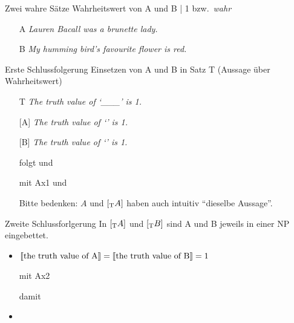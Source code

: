 \begin{frame}
  {Zwei wahre Sätze}
  \onslide<+->
  \onslide<+->
  Wahrheitswert von A und B | 1 bzw.\ \textit{wahr}\\
  \onslide<+->
  \Zeile
  \begin{itemize}[<+->]
    \item[A] \textit{Lauren Bacall was a brunette lady.}
    \item[B] \textit{My humming bird's favourite flower is red.} 
  \end{itemize}
\end{frame}

\begin{frame}
  {Erste Schlussfolgerung}
  \onslide<+->
  \onslide<+->
  Einsetzen von A und B in Satz T (Aussage über Wahrheitswert)\\
  \Halbzeile
  \begin{itemize}[<+->]
    \item[T] \alert{\textit{The truth value of `\_\_\_' is 1.}}
      \Halbzeile
    \item[{[\Sub{T}A]}] \alert{\textit{The truth value of `' is 1.}}
    \item[{[\Sub{T}B]}] \alert{\textit{The truth value of `' is 1.}}
      \Halbzeile
    \item[ ] folgt  und 
    \item[ ] mit Ax1  und 
      \Halbzeile
    \item[ ] Bitte bedenken: $A$ und $[_{\text{T}}A]$ haben auch intuitiv "`dieselbe Aussage"'.
  \end{itemize}
\end{frame}

\begin{frame}
  {Zweite Schlussforlgerung}
  \onslide<+->
  \onslide<+->
  In $[_{\text{T}}A]$ und $[_{\text{T}}B]$ sind A und B jeweils in einer NP eingebettet.\\
  \Halbzeile
  \begin{itemize}[<+->]
    \item $\llbracket\text{the truth value of A}\rrbracket=\llbracket\text{the truth value of B}\rrbracket=1$
    \item[ ] mit Ax2 \gruen{$\den{[\Sub{T}A]}=\den{[\Sub{T}B]}$}
    \item[ ] damit 
      \Halbzeile
    \item {}\\
  \end{itemize}
\end{frame}

